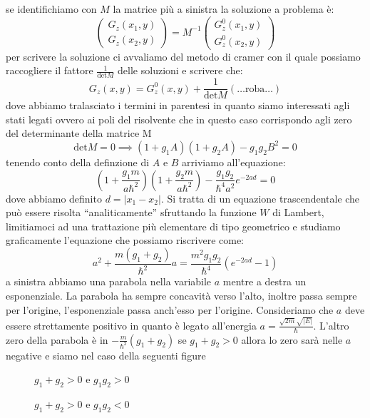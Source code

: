 se identifichiamo con $M$ la matrice più a sinistra la soluzione a problema è:
\[\begin{pmatrix}
G_z(x_1,y)\\
G_z(x_2,y)
\end{pmatrix}= M^{-1}\begin{pmatrix}
G_z^0(x_1,y)\\
G_z^0(x_2,y)
\end{pmatrix}\]
per scrivere la soluzione ci avvaliamo del metodo di cramer con il quale possiamo raccogliere il fattore $\frac{1}{\text{det}M}$ delle soluzioni e scrivere che:
\[G_z(x,y) = G_z^0(x,y) +\frac{1}{\text{det}M}(\dots \text{roba} \dots)\]
dove abbiamo tralasciato i termini in parentesi in quanto siamo interessati agli stati legati ovvero ai poli del risolvente che in questo caso corrispondo agli zero del determinante della matrice M
\[\text{det}M = 0 \implies (1+g_1A)(1+g_2A) - g_1g_2B^2 = 0\]
tenendo conto della definzione di $A$ e $B$ arriviamo all'equazione:
\[\left(1+\frac{g_1m}{a\hbar^2}\right)\left(1+\frac{g_2m}{a\hbar^2}\right) - \frac{g_1g_2}{\hbar^4a^2}e^{-2ad} = 0\]
dove abbiamo definito $d=|x_1-x_2|$. Si tratta di un equazione trascendentale che può essere risolta ``analiticamente'' sfruttando la funzione $W$ di Lambert, limitiamoci ad una trattazione più elementare di tipo geometrico e studiamo graficamente l'equazione che possiamo riscrivere come:
\[a^2 + \frac{m(g_1+g_2)}{\hbar^2}a= \frac{m^2g_1g_2}{\hbar^4}(e^{-2ad}-1)\]
a sinistra abbiamo una parabola nella variabile $a$ mentre a destra un esponenziale. La parabola ha sempre concavità verso l'alto, inoltre passa sempre per l'origine, l'esponenziale passa anch'esso per l'origine. Consideriamo che $a$ deve essere strettamente positivo in quanto è legato all'energia $a = \frac{\sqrt{2m}\sqrt{|E|}}{\hbar}$. L'altro zero della parabola è in $-\frac{m}{\hbar^2}(g_1+g_2)$ se $g_1+g_2>0$ allora lo zero sarà nelle $a$ negative e siamo nel caso della seguenti figure
\begin{figure}[H]
\centering
\begin{minipage}{.5\textwidth}
\centering
{}
\caption{$g_1+g_2>0$ e $g_1g_2>0$}
\end{minipage}%
\begin{minipage}{.5\textwidth}
\centering
{}
\caption{$g_1+g_2>0$ e $g_1g_2<0$}
\end{minipage}
\end{figure}
